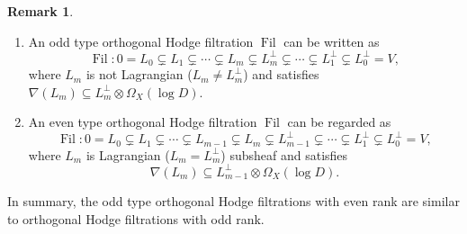 \documentclass[JEP,XML,SOM,Unicode,published]{cedram}
\DeclareMathOperator{\Filt}{Fil}
\theoremstyle{plain}
\theoremstyle{definition}
\newtheorem{rem}[thm]{Remark}
\begin{document}
\skpt
\begin{rem}
\begin{enumerate}
\item An odd type orthogonal Hodge filtration $\Filt$ can be written as
\[
\Filt: 0= L_0 \subsetneq L_1 \subsetneq \cdots \subsetneq L_m \subsetneq L_m^\perp\subsetneq\cdots \subsetneq L_1^\perp\subsetneq L_0^\perp= V,
\]
where $L_m$ is not Lagrangian (\ie $L_m\neq L_m^\perp$) and satisfies $\nabla(L_m)\subseteq L_m^\perp \otimes\Omega_X(\log D)$.

\item An even type orthogonal Hodge filtration $\Filt$ can be regarded as
\[
\Filt: 0= L_0 \subsetneq L_1 \subsetneq \cdots\subsetneq L_{m-1} \subsetneq L_m \subsetneq L_{m-1}^\perp\subsetneq\cdots \subsetneq L_1^\perp\subsetneq L_0^\perp= V,
\]
where $L_m$ is Lagrangian (\ie $L_m= L_m^\perp$) subsheaf and satisfies
\[
\nabla(L_m)\subseteq L_{m-1}^\perp \otimes\Omega_X(\log D).
\]
\end{enumerate}
In summary, the odd type orthogonal Hodge filtrations with even rank are similar to orthogonal Hodge filtrations with odd rank.
\end{rem}
\end{document}
